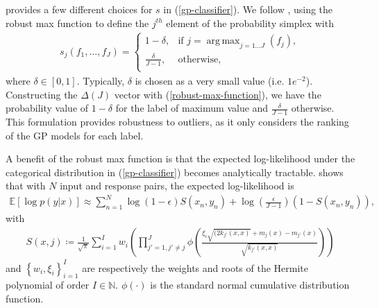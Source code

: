 \documentclass{article}
\DeclareMathOperator*{\argmax}{arg\,max}
\numberwithin{equation}{section}
\begin{document}
\cite{matthews2017scalable} provides a few different choices for $s$ in (\ref{gp-classifier}). We follow \cite{wild2022generalized}, using the robust max function to define the $j^{th}$ element of the probability simplex with
\begin{align}
s_{j}\left(f_1, \dots, f_J\right) = \begin{cases}
      1-\delta, &  \text{if } j = \argmax_{j=1\dots J}\left(f_j\right), \\
      \frac{\delta}{J-1}, & \text{otherwise}, \\
   \end{cases}
   \label{robust-max-function}
\end{align}
where $\delta \in [0, 1]$. Typically, $\delta$ is chosen as a very small value (i.e. $1e^{-2}$). Constructing the $\Delta(J)$ vector with (\ref{robust-max-function}), we have the probability value of $1-\delta$ for the label of maximum value and $\frac{\delta}{J-1}$ otherwise. This formulation provides robustness to outliers, as it only considers the ranking of the GP models for each label.

A benefit of the robust max function is that the expected log-likelihood under the categorical distribution in (\ref{gp-classifier}) becomes analytically tractable. \cite{wild2022generalized} shows that with $N$ input and response pairs, the expected log-likelihood is
\begin{align}
    \mathbb{E} \left[\log p\left(y \vert x\right)\right] \approx \sum_{n=1}^N \log(1-\epsilon) S(x_n, y_n) + \log\left(\frac{\epsilon}{J-1}\right) \left(1-S(x_n, y_n)\right),
    \label{robust-max-function-expected-log-likelihood}
\end{align}
with
\begin{align}
    S(x, j) \coloneqq \frac{1}{\sqrt{\pi}}\sum_{i=1}^{I} w_i \left(\prod_{j'=1, j'\neq j}^J \phi\left(\frac{\xi_i\sqrt{(2 k_{j'}(x, x)}+m_j(x) - m_{j'}(x)}{\sqrt{k_{j'}(x, x)}}\right)\right)
\end{align}
and $\left\{w_i, \xi_i\right\}_{i=1}^I$ are respectively the weights and roots of the Hermite polynomial of order $I \in \mathbb{N}$. $\phi(\cdot)$ is the standard normal cumulative distribution function.

\newpage
\end{document}

